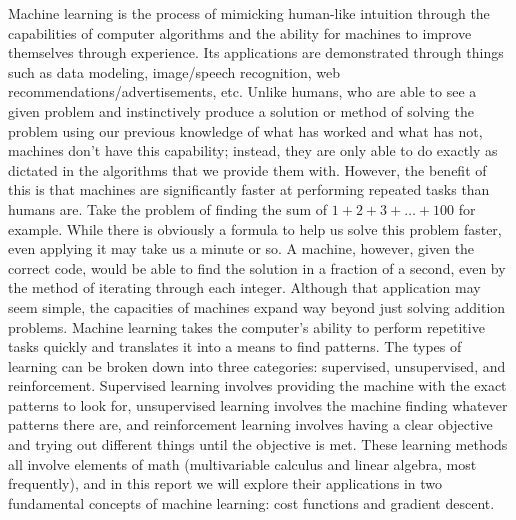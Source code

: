 \documentclass{article}
\begin{document}
Machine learning is the process of mimicking human-like intuition through the capabilities of computer algorithms and the ability for machines to improve themselves through experience. Its applications are demonstrated through things such as data modeling, image/speech recognition, web recommendations/advertisements, etc. Unlike humans, who are able to see a given problem and instinctively produce a solution or method of solving the problem using our previous knowledge of what has worked and what has not, machines don’t have this capability; instead, they are only able to do exactly as dictated in the algorithms that we provide them with. However, the benefit of this is that machines are significantly faster at performing repeated tasks than humans are. Take the problem of finding the sum of $1+2+3+\dots+100$ for example. While there is obviously a formula to help us solve this problem faster, even applying it may take us a minute or so. A machine, however, given the correct code, would be able to find the solution in a fraction of a second, even by the method of iterating through each integer. Although that application may seem simple, the capacities of machines expand way beyond just solving addition problems. Machine learning takes the computer’s ability to perform repetitive tasks quickly and translates it into a means to find patterns. The types of learning can be broken down into three categories: supervised, unsupervised, and reinforcement. Supervised learning involves providing the machine with the exact patterns to look for, unsupervised learning involves the machine finding whatever patterns there are, and reinforcement learning involves having a clear objective and trying out different things until the objective is met. These learning methods all involve elements of math (multivariable calculus and linear algebra, most frequently), and in this report we will explore their applications in two fundamental concepts of machine learning: cost functions and gradient descent. 
\end{document}

